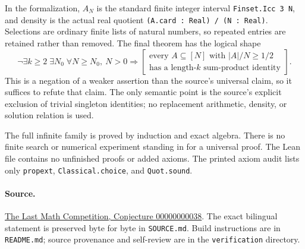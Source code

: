 \documentclass[11pt]{article}
\begin{document}
In the formalization, $A_N$ is the standard finite integer interval
\texttt{Finset.Icc 3 N}, and density is the actual real quotient
\texttt{(A.card : Real) / (N : Real)}. Selections are ordinary finite
lists of natural numbers, so repeated entries are retained rather than
removed. The final theorem has the logical shape
\[
 \neg\exists k\ge2\;\exists N_0\;\forall N\ge N_0,\ N>0\Longrightarrow
 \left[
 \begin{gathered}
  \text{every }A\subseteq[N]\text{ with }|A|/N\ge1/2\\
  \text{has a length-}k\text{ sum-product identity}
 \end{gathered}\right].
\]
This is a negation of a weaker assertion than the source's universal
claim, so it suffices to refute that claim. The only semantic point is
the source's explicit exclusion of trivial singleton identities; no
replacement arithmetic, density, or solution relation is used.

The full infinite family is proved by induction and exact algebra.
There is no finite search or numerical experiment standing in for a
universal proof. The Lean file contains no unfinished proofs or added
axioms. The printed axiom audit lists only
\texttt{propext}, \texttt{Classical.choice}, and \texttt{Quot.sound}.

\paragraph{Source.}
\href{https://github.com/The-Last-Math-Competition/The-Last-Math-Competition/blob/main/conjectures/00000000038.md}{The Last Math Competition, Conjecture 00000000038}.
The exact bilingual statement is preserved byte for byte in
\texttt{SOURCE.md}. Build instructions are in \texttt{README.md}; source
provenance and self-review are in the \texttt{verification} directory.
\end{document}
